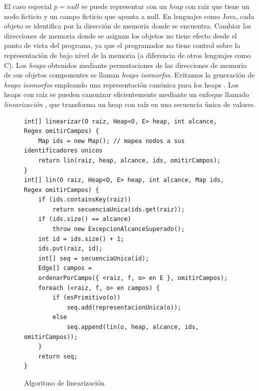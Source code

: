 El caso especial $p = null$ se puede representar con un \emph{heap} con raíz que tiene un nodo ficticio y un campo ficticio que apunta a null. En lenguajes como Java, cada objeto se identifica por la dirección de memoria donde se encuentra. Cambiar las direcciones de memoria donde se asignan los objetos no tiene efecto desde el punto de vista del programa, ya que el programador no tiene control sobre la representación de bajo nivel de la memoria (a diferencia de otros lenguajes como C). Los \emph{heaps} obtenidos mediante permutaciones de las direcciones de memoria de sus objetos componentes se llaman \emph{heaps isomorfos}. Evitamos la generación de \emph{heaps isomorfos} empleando una representación canónica para los heaps \cite{Iosif02,Boyapati02}. Los heaps con raíz se pueden canonizar eficientemente mediante un enfoque llamado \emph{linearización} \cite{Iosif02,Xie04}, que transforma un heap con raíz en una secuencia única de valores.

\bigbreak

\begin{figure}[!th]
\begin{lstlisting}
int[] linearizar(O raiz, Heap<O, E> heap, int alcance, Regex omitirCampos) {
    Map ids = new Map(); // mapea nodos a sus identificadores unicos
    return lin(raiz, heap, alcance, ids, omitirCampos);
}
int[] lin(O raiz, Heap<O, E> heap, int alcance, Map ids, Regex omitirCampos) {
    if (ids.containsKey(raiz))
        return secuenciaUnica(ids.get(raiz));
    if (ids.size() == alcance)
        throw new ExcepcionAlcanceSuperado();
    int id = ids.size() + 1;
    ids.put(raiz, id);
    int[] seq = secuenciaUnica(id);
    Edge[] campos =
    ordenarPorCampo({ <raiz, f, o> en E }, omitirCampos);
    foreach (<raiz, f, o> en campos) {
        if (esPrimitivo(o))
            seq.add(representacionUnica(o));
        else
            seq.append(lin(o, heap, alcance, ids, omitirCampos));
    }
    return seq;
}
\end{lstlisting}
\caption{Algoritmo de linearización}
\label{alg:linearization}
\end{figure}






